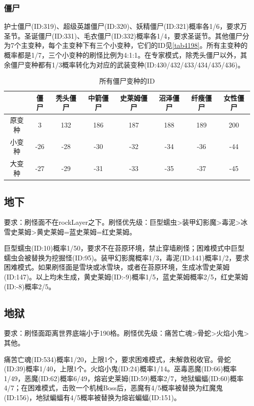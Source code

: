 \subsubsection{僵尸}\label{app17}
护士僵尸(ID:319)、超级英雄僵尸(ID:320)、妖精僵尸(ID:321)概率各1/6，要求万圣节。圣诞僵尸(ID:331)、毛衣僵尸(ID:332)概率各1/4，要求圣诞节。其他僵尸分为7个主变种，每个主变种下有三个小变种，它们的ID见\autoref{tab4198}。所有主变种的概率都是1/7，三个小变种的刷怪比例为4:1:1。在专家模式，除秃头僵尸以外，其余僵尸变种都有1/3概率转化为对应的武装变种(ID:430/432/433/434/435/436)。

\begin{table}[!h]
    \centering
    \begin{tabular}{c|ccccccc}
         &僵尸&秃头僵尸&中箭僵尸&史莱姆僵尸&沼泽僵尸&纤瘦僵尸&女性僵尸\\\hline
         原变种&3  &132&186&187&188&189&200\\
         小变种&-26&-28&-30&-32&-34&-36&-44\\
         大变种&-27&-29&-31&-33&-35&-37&-45
    \end{tabular}
    \caption{所有僵尸变种的ID}
    \label{tab4198}
\end{table}

\subsection{地下}
要求：刷怪面不在rockLayer之下。刷怪优先级：巨型蠕虫>装甲幻影魔>毒泥>冰雪史莱姆>黄史莱姆=蓝史莱姆=红史莱姆。

巨型蠕虫(ID:10)概率1/50，要求不在苔原环境，禁止穿墙刷怪；困难模式中巨型蠕虫会被替换为挖掘怪(ID:95)。装甲幻影魔概率1/3，毒泥(ID:141)概率1/2，要求困难模式。如果刷怪面是雪块或冰雪块，或者在苔原环境，生成冰雪史莱姆(ID:147)。以上均未生成，黄史莱姆(ID:-9)概率1/5，蓝史莱姆概率2/5，红史莱姆(ID:-8)概率2/5。

\subsection{地狱}
要求：刷怪面距离世界底端小于190格。刷怪优先级：痛苦亡魂>骨蛇>火焰小鬼>其他。

痛苦亡魂(ID:534)概率1/20，上限1个，要求困难模式，未解救税收官。骨蛇(ID:39)概率1/40，上限1个。火焰小鬼(ID:24)概率1/14。巫毒恶魔(ID:66)概率1/49，恶魔(ID:62)概率6/49，熔岩史莱姆(ID:59)概率2/7，地狱蝙蝠(ID:60)概率4/7；在困难模式，击败一个机械Boss后，恶魔有4/5概率被替换为红魔鬼(ID:156)，地狱蝙蝠有4/5概率被替换为熔岩蝙蝠(ID:151)。


